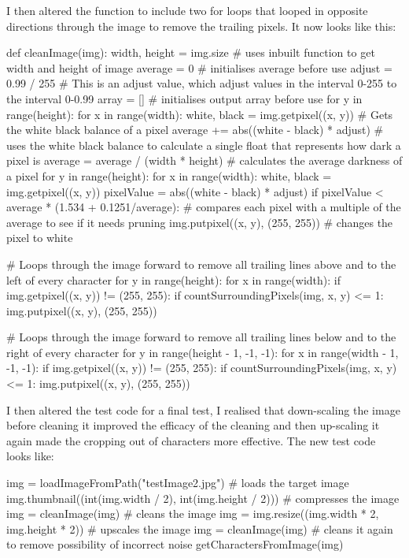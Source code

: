 \documentclass{report}
\begin{document}
I then altered the  function to include two for loops that looped in opposite directions through the image to remove the trailing pixels. It now looks like this:
\begin{python}
def cleanImage(img):
    width, height = img.size  # uses inbuilt function to get width and height of image
    average = 0  # initialises average before use
    adjust = 0.99 / 255  # This is an adjust value, which adjust values in the interval 0-255 to the interval 0-0.99
    array = []  # initialises output array before use
    for y in range(height):
        for x in range(width):
            white, black = img.getpixel((x, y))  # Gets the white black balance of a pixel
            average += abs((white - black) * adjust)  # uses the white black balance to calculate a single float that represents how dark a pixel is
    average = average / (width * height)  # calculates the average darkness of a pixel
    for y in range(height):
        for x in range(width):
            white, black = img.getpixel((x, y))
            pixelValue = abs((white - black) * adjust)
            if pixelValue < average * (1.534 + 0.1251/average):  # compares each pixel with a multiple of the average to see if it needs pruning
                img.putpixel((x, y), (255, 255))  # changes the pixel to white

    #  Loops through the image forward to remove all trailing lines above and to the left of every character
    for y in range(height):
        for x in range(width):
            if img.getpixel((x, y)) != (255, 255):
                if countSurroundingPixels(img, x, y) <= 1:
                    img.putpixel((x, y), (255, 255))

    #  Loops through the image forward to remove all trailing lines below and to the right of every character
    for y in range(height - 1, -1, -1):
        for x in range(width - 1, -1, -1):
            if img.getpixel((x, y)) != (255, 255):
                if countSurroundingPixels(img, x, y) <= 1:
                    img.putpixel((x, y), (255, 255))
\end{python}
I then altered the test code for a final test, I realised that down-scaling the image before cleaning it improved the efficacy of the cleaning and then up-scaling it again made the cropping out of characters more effective. The new test code looks like:
\begin{python}
img = loadImageFromPath("testImage2.jpg")  # loads the target image
img.thumbnail((int(img.width / 2), int(img.height / 2)))  # compresses the image
img = cleanImage(img)  # cleans the image
img = img.resize((img.width * 2, img.height * 2))  # upscales the image
img = cleanImage(img)  # cleans it again to remove possibility of incorrect noise
getCharactersFromImage(img)
\end{python}
\end{document}
